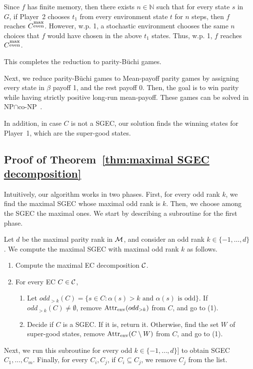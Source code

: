 \documentclass[runningheads,a4paper]{llncs}
\newcommand{\set}[1]{{\{#1\}}}
\newcommand{\Nat}{\mathbb{N}}
\newcommand{\C}{{\cal C}}
\newcommand{\M}{{\cal M}}
\newcommand{\buchi}{B\"uchi\xspace}
\newcommand{\sgec}{{SGEC}\xspace}
\newcommand{\attr}{{\rm Attr}}
\newcommand{\env}{{\rm env}}
\newcommand{\me}{{\substack{\rm max\\ \rm even}}}
\begin{document}
Since $f$ has finite memory, then there exists $n\in \Nat$ such that for every state $s$ in $G$, if Player~2 chooses $t_1$ from every environment state $t$ for $n$ steps, then $f$ reaches $C^{\me}$. However, w.p. 1, a stochastic environment chooses the same $n$ choices that $f$ would have chosen in the above $t_1$ states. Thus, w.p. 1, $f$ reaches $C^{\me}$.

This completes the reduction to parity-\buchi games.

Next, we reduce parity-\buchi games to Mean-payoff parity games by assigning every state in $\beta$ payoff 1, and the rest payoff 0. Then, the goal is to win parity while having strictly positive long-run mean-payoff. These games can be solved in NP$\cap$co-NP~\cite{CD11}.

In addition, in case $C$ is not a \sgec, our solution finds the winning states for Player~1, which are the super-good states.


\subsection{Proof of Theorem~\ref{thm:maximal SGEC decomposition}}
\label{apx:maximal SGEC decomposition}
Intuitively, our algorithm works in two phases. First, for every odd rank $k$, we find the maximal \sgec whose maximal odd rank is $k$. Then, we choose among the \sgec the maximal ones. We start by describing a subroutine for the first phase.

Let $d$ be the maximal parity rank in $\M$, and consider an odd rank $k\in \set{-1,\ldots,d}$. We compute the maximal \sgec with maximal odd rank $k$ as follows.
\begin{enumerate}
\item Compute the maximal EC decomposition $\C$.
\item For every EC $C\in \C$,
\begin{enumerate}
\item Let $odd_{>k}(C)=\set{s\in C: \alpha(s)>k \text{ and }\alpha(s)\text{ is odd}}$. If $odd_{>k}(C)\neq \emptyset$, remove $\attr_{\env}(odd_{>k})$ from $C$, and go to (1).
\item Decide if $C$ is a \sgec. If it is, return it. Otherwise, find the set $W$ of super-good states, remove $\attr_{\env}(C\setminus W)$ from $C$, and go to (1).
\end{enumerate}
\end{enumerate}
Next, we run this subroutine for every odd $k\in \set{-1,\ldots ,d}]$ to obtain \sgec $C_1,...,C_m$. Finally, for every $C_i,C_j$, if $C_i\subseteq C_j$, we remove $C_j$ from the list. 
\end{document}
